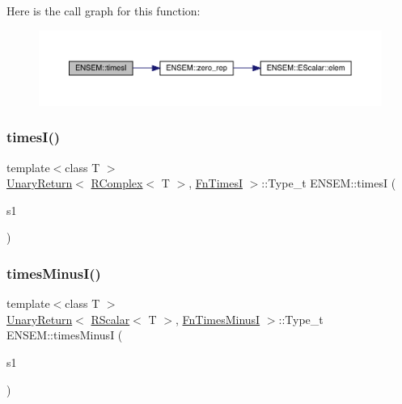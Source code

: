 Here is the call graph for this function\+:\nopagebreak
\begin{figure}[H]
\begin{center}
\leavevmode
\includegraphics[width=350pt]{da/dc7/group__rcomplex_ga1741ab434937b21a3f54881161f429aa_cgraph}
\end{center}
\end{figure}
\mbox{\label{group__rcomplex_gaf442aefeacd8aece996f6a9d9028d72e}} 
\subsubsection{\texorpdfstring{timesI()}{timesI()}\hspace{0.1cm}{\footnotesize\ttfamily [2/2]}}
{\footnotesize\ttfamily template$<$class T $>$ \\
\mbox{\hyperlink{structENSEM_1_1UnaryReturn}{Unary\+Return}}$<$ \mbox{\hyperlink{classENSEM_1_1RComplex}{R\+Complex}}$<$ T $>$, \mbox{\hyperlink{structENSEM_1_1FnTimesI}{Fn\+TimesI}} $>$\+::Type\+\_\+t E\+N\+S\+E\+M\+::timesI (\begin{DoxyParamCaption}\item[{const \mbox{\hyperlink{classENSEM_1_1RComplex}{R\+Complex}}$<$ T $>$ \&}]{s1 }\end{DoxyParamCaption})\hspace{0.3cm}{\ttfamily [inline]}}

\mbox{\label{group__rcomplex_gaf58bc5b02a5a7fed1251f5ad0f33325a}} 
\subsubsection{\texorpdfstring{timesMinusI()}{timesMinusI()}\hspace{0.1cm}{\footnotesize\ttfamily [1/2]}}
{\footnotesize\ttfamily template$<$class T $>$ \\
\mbox{\hyperlink{structENSEM_1_1UnaryReturn}{Unary\+Return}}$<$ \mbox{\hyperlink{classENSEM_1_1RScalar}{R\+Scalar}}$<$ T $>$, \mbox{\hyperlink{structENSEM_1_1FnTimesMinusI}{Fn\+Times\+MinusI}} $>$\+::Type\+\_\+t E\+N\+S\+E\+M\+::times\+MinusI (\begin{DoxyParamCaption}\item[{const \mbox{\hyperlink{classENSEM_1_1RScalar}{R\+Scalar}}$<$ T $>$ \&}]{s1 }\end{DoxyParamCaption})\hspace{0.3cm}{\ttfamily [inline]}}


